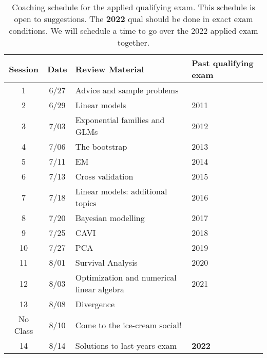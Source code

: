 \begin{table}[h]
\centering
	\begin{tabular}{| c c l l|}
		\hline
	Session & Date & Review Material & Past qualifying exam \\ 
		\hline\hline
		1 & 6/27 & Advice and sample problems &  \\ 
		\hline
		2 & 6/29 & Linear models  & 2011 \\
		\hline
		3 & 7/03 & Exponential families and GLMs & 2012 \\
		\hline
		4 & 7/06 & The bootstrap & 2013  \\ 
		\hline
		5 & 7/11 & EM & 2014 \\
		\hline
		6 & 7/13 & Cross validation & 2015 \\
		\hline
		7 & 7/18 & Linear models: additional topics & 2016 \\
		\hline
		8 & 7/20 & Bayesian modelling & 2017 \\ 
		\hline
		9 & 7/25 & CAVI & 2018 \\
		\hline
		10 & 7/27 & PCA & 2019  \\ 
		\hline
		11 & 8/01 & Survival Analysis & 2020  \\
		\hline 
		12 & 8/03 & Optimization and numerical linear algebra & 2021\\ 
		\hline
		13 & 8/08 & Divergence &\\
		\hline 
		No Class & 8/10 & Come to the ice-cream social!&\\
		\hline
		14 & 8/14 & Solutions to last-years exam & \textbf{2022} \\
		\hline 
\end{tabular}

\caption{Coaching schedule for the applied qualifying exam. This schedule is open to suggestions. The \textbf{2022} qual should be done in exact exam conditions. We will schedule a time to go over the 2022 applied exam together.}
\label{table:schedule}
\end{table}
